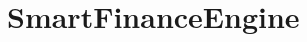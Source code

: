 \chapter{Smart\+Finance\+Engine }
\hypertarget{md__r_e_a_d_m_e}{}\label{md__r_e_a_d_m_e}
\label{md__r_e_a_d_m_e_autotoc_md0}%
%
